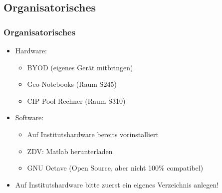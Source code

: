     \subsection{Organisatorisches}
    \begin{frame}
        \frametitle{Organisatorisches}

        \vspace{-1.0cm}

        \begin{itemize}
          \item Hardware:

          \begin{itemize}
            \itemsep0.3cm
            \item BYOD (eigenes Gerät mitbringen)
            \item Geo-Notebooks (Raum S245)
            \item CIP Pool Rechner (Raum S310)
          \end{itemize}

          \item Software:

          \begin{itemize}
            \itemsep0.3cm
            \item Auf Institutshardware bereits vorinstalliert
            \item ZDV: Matlab herunterladen \href{https://services.zdv.uni-tuebingen.de/CampusSoftware/}{}
            \item GNU Octave \href{https://www.gnu.org/software/octave/}{} (Open Source, aber nicht 100\% compatibel)
          \end{itemize}

          \item \alert{Auf Institutshardware bitte zuerst ein eigenes Verzeichnis anlegen!}

        \end{itemize}
    \end{frame}

